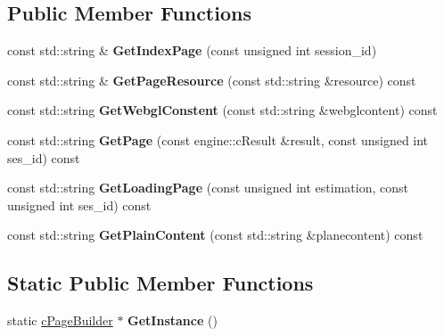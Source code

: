 \subsection*{\-Public \-Member \-Functions}
\begin{DoxyCompactItemize}
\item 
\hypertarget{classhttp__server_1_1cPageBuilder_aad87a17faa8505727c8faac59a7a9674}{const std\-::string \& {\bfseries \-Get\-Index\-Page} (const unsigned int session\-\_\-id)}\label{classhttp__server_1_1cPageBuilder_aad87a17faa8505727c8faac59a7a9674}

\item 
\hypertarget{classhttp__server_1_1cPageBuilder_ac7a52ef639767e3f9297376cced2a8ab}{const std\-::string \& {\bfseries \-Get\-Page\-Resource} (const std\-::string \&resource) const }\label{classhttp__server_1_1cPageBuilder_ac7a52ef639767e3f9297376cced2a8ab}

\item 
\hypertarget{classhttp__server_1_1cPageBuilder_a4fe126d4cae409f0e9790cbcf187185f}{const std\-::string {\bfseries \-Get\-Webgl\-Constent} (const std\-::string \&webglcontent) const }\label{classhttp__server_1_1cPageBuilder_a4fe126d4cae409f0e9790cbcf187185f}

\item 
\hypertarget{classhttp__server_1_1cPageBuilder_a399e3fcab5b631e64907a183af1e8b44}{const std\-::string {\bfseries \-Get\-Page} (const engine\-::c\-Result \&result, const unsigned int ses\-\_\-id) const }\label{classhttp__server_1_1cPageBuilder_a399e3fcab5b631e64907a183af1e8b44}

\item 
\hypertarget{classhttp__server_1_1cPageBuilder_a903fe3604f402c70bd04aefbbe322cbc}{const std\-::string {\bfseries \-Get\-Loading\-Page} (const unsigned int estimation, const unsigned int ses\-\_\-id) const }\label{classhttp__server_1_1cPageBuilder_a903fe3604f402c70bd04aefbbe322cbc}

\item 
\hypertarget{classhttp__server_1_1cPageBuilder_a1d94480e16491f15aa3ed974dfb181e1}{const std\-::string {\bfseries \-Get\-Plain\-Content} (const std\-::string \&planecontent) const }\label{classhttp__server_1_1cPageBuilder_a1d94480e16491f15aa3ed974dfb181e1}

\end{DoxyCompactItemize}
\subsection*{\-Static \-Public \-Member \-Functions}
\begin{DoxyCompactItemize}
\item 
\hypertarget{classhttp__server_1_1cPageBuilder_acf7940105f1b4f5d77a0cecac9a69db6}{static \hyperlink{classhttp__server_1_1cPageBuilder}{c\-Page\-Builder} $\ast$ {\bfseries \-Get\-Instance} ()}\label{classhttp__server_1_1cPageBuilder_acf7940105f1b4f5d77a0cecac9a69db6}

\end{DoxyCompactItemize}
